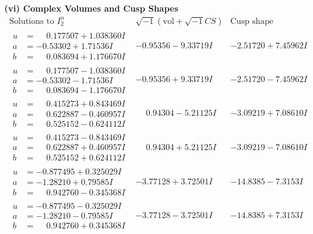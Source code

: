 \documentclass[1p]{elsarticle_modified}
\theoremstyle{definition}
\newcommand{\I}{\sqrt{-1}}
\begin{document}
\newpage\flushleft \textbf{(vi) Complex Volumes and Cusp Shapes}
$$\begin{array}{c|c|c}  
\text{Solutions to }I^u_{2}& \I (\text{vol} + \sqrt{-1}CS) & \text{Cusp shape}\\
 \hline 
\begin{aligned}
u &= \phantom{-}0.177507 + 1.038360 I \\
a &= -0.53302 + 1.71536 I \\
b &= \phantom{-}0.083694 + 1.176670 I\end{aligned}
 & -0.95356 - 9.33719 I & -2.51720 + 7.45962 I \\ \hline\begin{aligned}
u &= \phantom{-}0.177507 - 1.038360 I \\
a &= -0.53302 - 1.71536 I \\
b &= \phantom{-}0.083694 - 1.176670 I\end{aligned}
 & -0.95356 + 9.33719 I & -2.51720 - 7.45962 I \\ \hline\begin{aligned}
u &= \phantom{-}0.415273 + 0.843469 I \\
a &= \phantom{-}0.622887 - 0.460957 I \\
b &= \phantom{-}0.525152 - 0.624112 I\end{aligned}
 & \phantom{-}0.94304 - 5.21125 I & -3.09219 + 7.08610 I \\ \hline\begin{aligned}
u &= \phantom{-}0.415273 - 0.843469 I \\
a &= \phantom{-}0.622887 + 0.460957 I \\
b &= \phantom{-}0.525152 + 0.624112 I\end{aligned}
 & \phantom{-}0.94304 + 5.21125 I & -3.09219 - 7.08610 I \\ \hline\begin{aligned}
u &= -0.877495 + 0.325029 I \\
a &= -1.28210 + 0.79585 I \\
b &= \phantom{-}0.942760 - 0.345368 I\end{aligned}
 & -3.77128 + 3.72501 I & -14.8385 - 7.3153 I \\ \hline\begin{aligned}
u &= -0.877495 - 0.325029 I \\
a &= -1.28210 - 0.79585 I \\
b &= \phantom{-}0.942760 + 0.345368 I\end{aligned}
 & -3.77128 - 3.72501 I & -14.8385 + 7.3153 I \\ \hline\begin{aligned}

\end{aligned}
\end{array}$$
\end{document}

